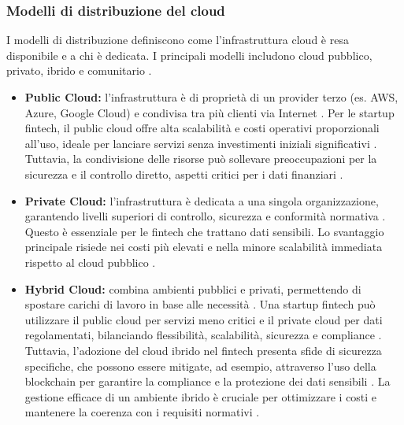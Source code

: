 \subsubsection{Modelli di distribuzione del cloud}

I modelli di distribuzione definiscono come l'infrastruttura cloud è resa disponibile e a chi è dedicata. I principali modelli includono cloud pubblico, privato, ibrido e comunitario \cite{maticmind2024hybrid, iso2018overview}.

\begin{itemize}
    \item \textbf{Public Cloud:} l'infrastruttura è di proprietà di un provider terzo (es. AWS, Azure, Google Cloud) e condivisa tra più clienti via Internet \cite{maticmind2024hybrid}. Per le startup fintech, il public cloud offre alta scalabilità e costi operativi proporzionali all'uso, ideale per lanciare servizi senza investimenti iniziali significativi \cite{maticmind2024hybrid}. Tuttavia, la condivisione delle risorse può sollevare preoccupazioni per la sicurezza e il controllo diretto, aspetti critici per i dati finanziari \cite{vats2024systematic, maticmind2024hybrid}.
    
    \item \textbf{Private Cloud:} l'infrastruttura è dedicata a una singola organizzazione, garantendo livelli superiori di controllo, sicurezza e conformità normativa \cite{maticmind2024hybrid}. Questo è essenziale per le fintech che trattano dati sensibili. Lo svantaggio principale risiede nei costi più elevati e nella minore scalabilità immediata rispetto al cloud pubblico \cite{maticmind2024hybrid}.
    
    \item \textbf{Hybrid Cloud:} combina ambienti pubblici e privati, permettendo di spostare carichi di lavoro in base alle necessità \cite{maticmind2024hybrid}. Una startup fintech può utilizzare il public cloud per servizi meno critici e il private cloud per dati regolamentati, bilanciando flessibilità, scalabilità, sicurezza e compliance \cite{maticmind2024hybrid}. Tuttavia, l'adozione del cloud ibrido nel fintech presenta sfide di sicurezza specifiche, che possono essere mitigate, ad esempio, attraverso l'uso della blockchain per garantire la compliance e la protezione dei dati sensibili \cite{urf2024security, vats2024systematic}. La gestione efficace di un ambiente ibrido è cruciale per ottimizzare i costi e mantenere la coerenza con i requisiti normativi \cite{maticmind2024hybrid}.
\end{itemize}

